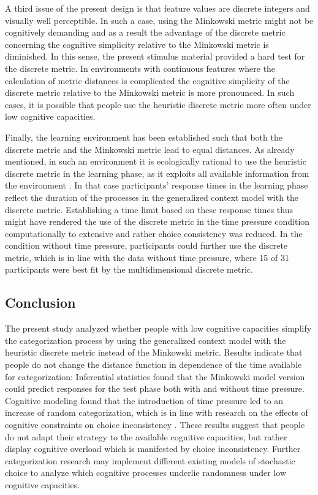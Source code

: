 \documentclass[a4paper,man,natbib]{apa6}
\begin{document}
A third issue of the present design is that feature values are discrete integers and visually well perceptible. In such a case, using the Minkowski metric might not be cognitively demanding and as a result the advantage of the discrete metric concerning the cognitive simplicity relative to the Minkowski metric is diminished. In this sense, the present stimulus material provided a hard test for the discrete metric. In environments with continuous features where the calculation of metric distances is complicated the cognitive simplicity of the discrete metric relative to the Minkowski metric is more pronounced. In such cases, it is possible that people use the heuristic discrete metric more often under low cognitive capacities.

Finally, the learning environment has been established such that both the discrete metric and the Minkowski metric lead to equal distances. As already mentioned, in such an environment it is ecologically rational to use the heuristic discrete metric in the learning phase, as it exploits all available information from the environment \citep{todd2007environments}. In that case participants' response times in the learning phase reflect the duration of the processes in the generalized context model with the discrete metric. Establishing a time limit based on these response times thus might have rendered the use of the discrete metric in the time pressure condition computationally to extensive and rather choice consistency was reduced. In the condition without time pressure, participants could further use the discrete metric, which is in line with the data without time pressure, where 15 of 31 participants were best fit by the multidimensional discrete metric.

\subsection{Conclusion}
The present study analyzed whether people with low cognitive capacities simplify the categorization process by using the generalized context model \citep{nosofsky1986attention} with the heuristic discrete metric instead of the Minkowski metric. Results indicate that people do not change the distance function in dependence of the time available for categorization: Inferential statistics found that the Minkowski model version could predict responses for the test phase both with and without time pressure. Cognitive modeling found that the introduction of time pressure led to an increase of random categorization, which is in line with research on the effects of cognitive constraints on choice inconsistency \citep{olschewski2018taxing}. These results suggest that people do not adapt their strategy to the available cognitive capacities, but rather display cognitive overload which is manifested by choice inconsistency. Further categorization research may implement different existing models of stochastic choice \citep{blavatskyy2010models, becker1963stochastic} to analyze which cognitive processes underlie  randomness under low cognitive capacities.
\end{document}
